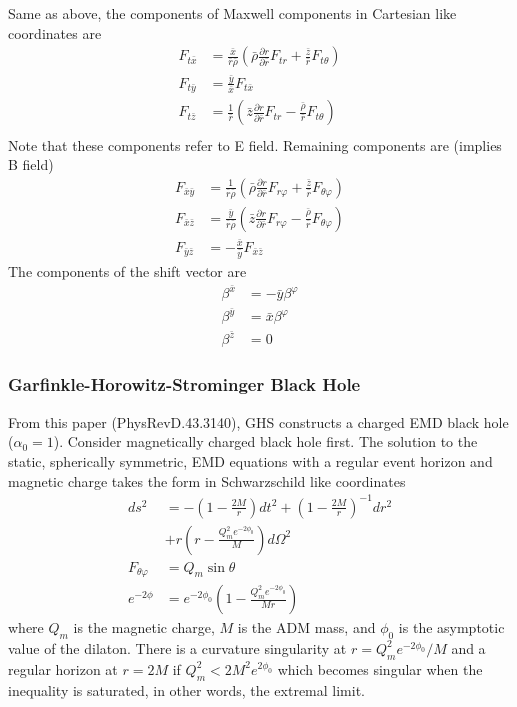 \documentclass[%
 reprint,
 amsmath,amssymb,
 aps,
]{revtex4-1}
\begin{document}
Same as above, the components of Maxwell components in Cartesian like coordinates are
\begin{align}
F_{t \bar{x}} &= \frac{ \bar{x} }{\bar{r} \bar{\rho}} \left(\bar{\rho} \frac{\partial r}{\partial \bar{r}} F_{t r} + \frac{\bar{z}}{\bar{r}} F_{t \theta} \right) \\
F_{t \bar{y}} &= \frac{\bar{y}}{\bar{x}} F_{t \bar{x}}\\
F_{t \bar{z}} &= \frac{1}{\bar{r}} \left(\bar{z} \frac{\partial r}{\partial \bar{r}} F_{t r} - \frac{\bar{\rho}}{\bar{r}} F_{t \theta} \right) \\
\end{align}
Note that these components refer to E field. Remaining components are (implies B field)
\begin{align}
F_{\bar{x} \bar{y}} &= \frac{1}{\bar{r} \bar{\rho}} \left(\bar{\rho} \frac{\partial r}{\partial \bar{r}} F_{r \varphi} + \frac{\bar{z}}{\bar{r}} F_{\theta \varphi} \right) \\
F_{\bar{x} \bar{z}} &= \frac{\bar{y}}{\bar{r} \bar{\rho}} \left(\bar{z} \frac{\partial r}{\partial \bar{r}} F_{r \varphi} - \frac{\bar{\rho}}{\bar{r}} F_{\theta \varphi} \right) \\
F_{\bar{y} \bar{z}} &= -\frac{\bar{x}}{\bar{y}} F_{\bar{x} \bar{z}}
\end{align}
The components of the shift vector are
\begin{align}
\beta^{\bar{x}} &= - \bar{y} \beta^{\varphi} \\
\beta^{\bar{y} }&= \bar{x} \beta^{\varphi} \\
\beta^{\bar{z}} &= 0
\end{align}



\subsubsection{Garfinkle-Horowitz-Strominger Black Hole}

From this paper (PhysRevD.43.3140), GHS constructs a charged EMD black hole ($\alpha_0 =1$). Consider magnetically charged black hole first. The solution to the static, spherically symmetric, EMD equations with a regular event horizon and magnetic charge takes the form in Schwarzschild like coordinates
\begin{align}
ds^2 &= - \left( 1-\frac{2M}{r} \right) dt^2 + \left(1-\frac{2M}{r} \right)^{-1} dr^2 \nonumber \\
&+ r \left(r - \frac{Q_m^2 e^{-2 \phi_0}}{M} \right) d\Omega^2 \\
F_{\theta \varphi} &= Q_m \sin \theta \\
e^{-2 \phi} &= e^{-2 \phi_0} \left(1 - \frac{Q_m^2 e^{-2 \phi_0}}{M r} \right)
\end{align}
where $Q_m$ is the magnetic charge, $M$ is the ADM mass, and $\phi_0$ is the asymptotic value of the dilaton. There is a curvature singularity at $r=Q^2_m e^{-2 \phi_0} /M$ and a regular horizon at $r=2M$ if $Q^2_m < 2 M^2 e^{2\phi_0}$ which becomes singular when the inequality is saturated, in other words, the extremal limit.
\end{document}
